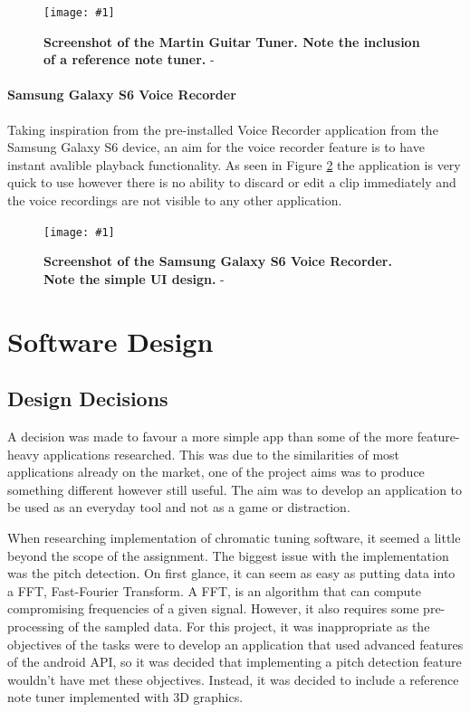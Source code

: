 \documentclass[conference]{acmsiggraph}
\newcommand{\figuremacroW}[4]{
	\begin{figure}[H] %
		\centering
		\texttt{[image: \#1]}
		\caption[#2]{\textbf{#2} - #3}
		\label{fig:#1}
	\end{figure}
}
\begin{document}
\figuremacroW
{martinTuner}
{Screenshot of the Martin Guitar Tuner. Note the inclusion of a reference note tuner.}
{\protect\cite{Martin}}
{1.0}

\paragraph{Samsung Galaxy S6 Voice Recorder}

Taking inspiration from the pre-installed Voice Recorder application from the Samsung Galaxy S6 device, an aim for the voice recorder feature is to have instant avalible playback functionality. As seen in Figure \ref{fig:voice} the application is very quick to use however there is no ability to discard or edit a clip immediately and the voice recordings are not visible to any other application.

\figuremacroW
{voice}
{Screenshot of the Samsung Galaxy S6 Voice Recorder. Note the simple UI design.}
{\protect\cite{Samsung}}
{1.0}

\section{Software Design}

\subsection{Design Decisions}

A decision was made to favour a more simple app than some of the more feature-heavy applications researched. This was due to the similarities of most applications already on the market, one of the project aims was to produce something different however still useful. The aim was to develop an application to be used as an everyday tool and not as a game or distraction.

When researching implementation of chromatic tuning software, it seemed a little beyond the scope of the assignment. The biggest issue with the implementation was the pitch detection. On first glance, it can seem as easy as putting data into a FFT, Fast-Fourier Transform. A FFT, is an algorithm that can compute compromising frequencies of a given signal. \cite{FFT} However, it also requires some pre-processing of the sampled data. For this project, it was inappropriate as the objectives of the tasks were to develop an application that used advanced features of the android API, so it was decided that implementing a pitch detection feature wouldn't have met these objectives. Instead, it was decided to include a reference note tuner implemented with 3D graphics.
\end{document}
